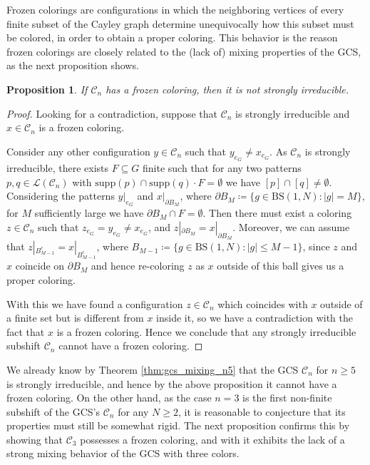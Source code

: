 \documentclass[letterpaper,10pt]{article}
\theoremstyle{plain}
\newtheorem{proposition}[theorem]{Proposition}
\newcommand{\BS}[1][N]{\mathrm{BS}(1,#1)}
\begin{document}
Frozen colorings are configurations in which the neighboring vertices of every finite subset of the Cayley graph determine unequivocally how this subset must be colored, in order to obtain a proper coloring. This behavior is the reason frozen colorings are closely related to the (lack of) mixing properties of the GCS, as the next proposition shows.
\begin{proposition} \label{prop:froz_col_not_si} If $\mathcal{C}_n$ has a frozen coloring, then it is not strongly irreducible.
\end{proposition}
\begin{proof}
	
	Looking for a contradiction, suppose that $\mathcal{C}_n$ is strongly irreducible and $x\in \mathcal{C}_n$ is a frozen coloring. 
	
	Consider any other configuration $y\in \mathcal{C}_n$ such that $y_{e_G}\neq x_{e_G}$. As $\mathcal{C}_n$ is strongly irreducible, there exists $F\subseteq G$ finite such that for any two patterns $p,q\in \mathcal{L}(\mathcal{C}_n)$ with $\mathrm{supp}(p)\cap \mathrm{supp}(q)\cdot F=\emptyset$ we have $[p]\cap [q]\neq \emptyset$. Considering the patterns $y|_{e_G}$ and $x|_{\partial B_M}$, where $\partial B_M\coloneqq \{g\in \BS: |g|=M\}$, for $M$ sufficiently large we have $\partial B_M \cap F= \emptyset$. Then there must exist a coloring $z\in \mathcal{C}_n$ such that $z_{e_G}=y_{e_G}\neq x_{e_G}$, and $z|_{\partial B_M}=x|_{\partial B_M}$. Moreover, we can assume that $z|_{B_{M-1}^c}=x|_{B_{M-1}^c}$, where $B_{M-1}\coloneqq \{g\in \BS: |g|\le M-1 \}$, since $z$ and $x$ coincide on $\partial B_M$ and hence re-coloring $z$ as $x$ outside of this ball gives us a proper coloring. 
	
	With this we have found a configuration $z\in \mathcal{C}_n$ which coincides with $x$ outside of a finite set but is different from $x$ inside it, so we have a contradiction with the fact that $x$ is a frozen coloring. Hence we conclude that any strongly irreducible subshift $\mathcal{C}_n$ cannot have a frozen coloring.
\end{proof}
We already know by Theorem \ref{thm:gcs_mixing_n5} that the GCS $\mathcal{C}_n$ for $n\ge 5$ is strongly irreducible, and hence by the above proposition it cannot have a frozen coloring. On the other hand, as the case $n=3$ is the first non-finite subshift of the GCS's $\mathcal{C}_n$ for any $N\ge 2$, it is reasonable to conjecture that its properties must still be somewhat rigid. The next proposition confirms this by showing that $\mathcal{C}_3$ possesses a frozen coloring, and with it exhibits the lack of a strong mixing behavior of the GCS with three colors.
\end{document}
